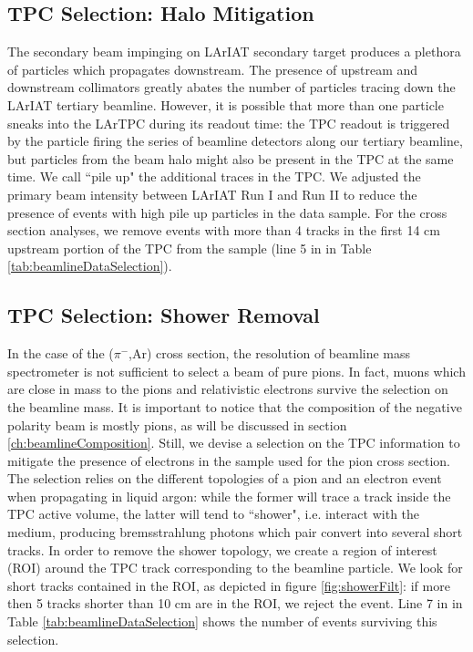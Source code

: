 \subsection{TPC Selection: Halo Mitigation }\label{ch:pileUp}
The secondary beam impinging on LArIAT secondary target produces a plethora of particles which propagates downstream. The presence of upstream and downstream collimators greatly abates the number of particles tracing down the LArIAT tertiary beamline. However, it is possible that more than one particle sneaks into the LArTPC during its readout time: the TPC readout is triggered by the particle  firing the series of beamline detectors along our tertiary beamline, but particles from the beam halo might also be present in the TPC at the same time. We call ``pile up" the additional traces in the TPC. We adjusted the primary beam intensity between LArIAT Run I and Run II to reduce the presence of events with high pile up particles in the data sample. For the cross section analyses, we remove events with more than 4 tracks in the first 14 cm upstream portion of the TPC from the sample (line 5 in in Table \ref{tab:beamlineDataSelection}).


\subsection{TPC Selection: Shower Removal}\label{ch:electrons}
In the case of the ($\pi^-$,Ar) cross section, the resolution of  beamline mass spectrometer is not sufficient to select a beam of pure pions. In fact,  muons which are close in mass to the pions and relativistic electrons survive the selection on the beamline mass.  It is important to notice that the composition of the negative polarity beam is mostly pions, as will be discussed in section \ref{ch:beamlineComposition}.
Still, we devise a selection on the TPC information to mitigate the presence of electrons in the sample used for the pion cross section. The selection relies on the different topologies of a pion and an electron event when propagating in liquid argon: while the former will trace a track inside the TPC active volume, the latter will tend to ``shower", i.e. interact with the medium, producing bremsstrahlung photons which pair convert into several short tracks. In order to remove the shower topology, we create a region of interest (ROI) around the TPC track corresponding to the beamline particle. We look for short tracks contained in the ROI, as depicted in figure \ref{fig:showerFilt}:  if more then 5 tracks shorter than 10 cm are in the ROI, we reject the event. Line 7 in in Table \ref{tab:beamlineDataSelection} shows the number of events surviving this selection.

